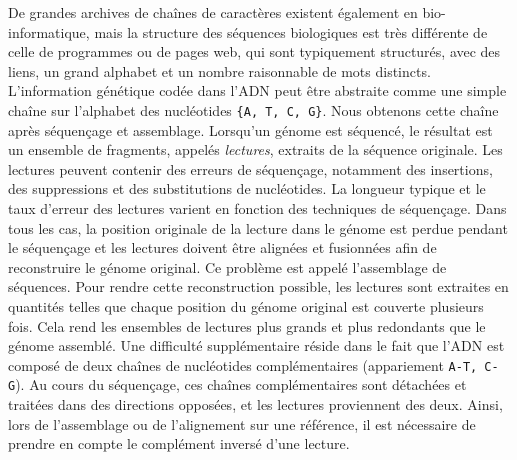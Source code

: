 De grandes archives de chaînes de caractères existent également en bio-informatique, mais la structure des séquences biologiques est très différente de celle de programmes ou de pages web, qui sont typiquement structurés, avec des liens, un grand alphabet et un nombre raisonnable de mots distincts.
L'information génétique codée dans l'ADN peut être abstraite comme une simple chaîne sur l'alphabet des nucléotides \texttt{\{A, T, C, G\}}.
Nous obtenons cette chaîne après séquençage et assemblage. Lorsqu'un génome est séquencé, le résultat est un ensemble de fragments, appelés \emph{lectures}, extraits de la séquence originale. Les lectures peuvent contenir des erreurs de séquençage, notamment des insertions, des suppressions et des substitutions de nucléotides. La longueur typique et le taux d'erreur des lectures varient en fonction des techniques de séquençage.
%
Dans tous les cas, la position originale de la lecture dans le génome est perdue pendant le séquençage et les lectures doivent être alignées et fusionnées afin de reconstruire le génome original. Ce problème est appelé l'assemblage de séquences. Pour rendre cette reconstruction possible, les lectures sont extraites en quantités telles que chaque position du génome original est couverte plusieurs fois. Cela rend les ensembles de lectures plus grands et plus redondants que le génome assemblé. 
Une difficulté supplémentaire réside dans le fait que l'ADN est composé de deux chaînes de nucléotides complémentaires (appariement \texttt{A-T, C-G}). Au cours du séquençage, ces chaînes complémentaires sont détachées et traitées dans des directions opposées, et les lectures proviennent des deux. Ainsi, lors de l'assemblage ou de l'alignement sur une référence, il est nécessaire de prendre en compte le complément inversé d'une lecture.


